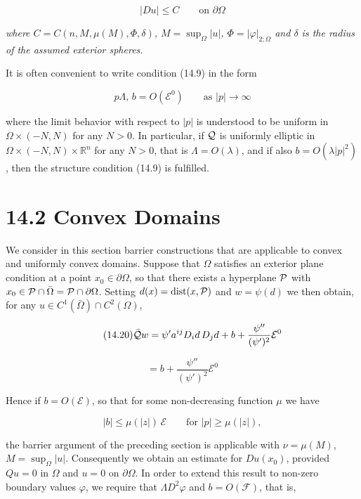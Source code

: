 \begin{equation}\tag{14.18}
|Du|\leq C \qquad \text{on }\partial\Omega
\end{equation}

\emph{where $C=C(n, M, \mu(M), \Phi, \delta)$, $M=\sup_{\Omega}|u|$, $\Phi=|\varphi|_{2;\Omega}$ and $\delta$ is the radius of the assumed exterior spheres.}

It is often convenient to write condition (14.9) in the form

\begin{equation}\tag{14.19}
p\Lambda,\, b = O(\mathcal{E}^0) \qquad \text{as } |p|\to\infty
\end{equation}

where the limit behavior with respect to $|p|$ is understood to be uniform in $\Omega\times(-N,N)$ for any $N>0$. In particular, if $\mathcal{Q}$ is uniformly elliptic in $\Omega\times(-N,N)\times\mathbb{R}^n$ for any $N>0$, that is $\Lambda=O(\lambda)$, and if also $b=O(\lambda|p|^2)$, then the structure condition (14.9) is fulfilled.

\section*{14.2 Convex Domains}

We consider in this section barrier constructions that are applicable to convex and uniformly convex domains. Suppose that $\Omega$ satisfies an exterior plane condition at a point $x_0\in\partial\Omega$, so that there exists a hyperplane $\mathcal{P}$ with $x_0\in\mathcal{P}\cap\bar{\Omega}=\mathcal{P}\cap\partial\Omega$. Setting $d(x)=\operatorname{dist}(x,\mathcal{P})$ and $w=\psi(d)$ we then obtain, for any $u\in C^1(\bar{\Omega})\cap C^2(\Omega)$,

\begin{equation}\tag{14.20}
\bar{\mathcal{Q}}w=\psi' a^{ij}D_i d\, D_j d+b+\frac{\psi''}{(\psi')^2}\mathcal{E}^0
\end{equation}

\[
=b+\frac{\psi''}{(\psi')^2}\mathcal{E}^0
\]



Hence if $b = O(\mathscr{E})$, so that for some non-decreasing function $\mu$ we have

\begin{equation}
|b| \leq \mu(|z|)\,\mathscr{E} \qquad \text{for } |p| \geq \mu(|z|),
\tag{14.21}
\end{equation}

the barrier argument of the preceding section is applicable with $\nu = \mu(M)$, $M = \sup_{\Omega} |u|$.
Consequently we obtain an estimate for $Du(x_0)$, provided $Qu = 0$ in $\Omega$ and $u = 0$
on $\partial \Omega$. In order to extend this result to non-zero boundary values $\varphi$, we require
that $\Lambda D^2 \varphi$ and $b = O(\mathscr{F})$, that is,

